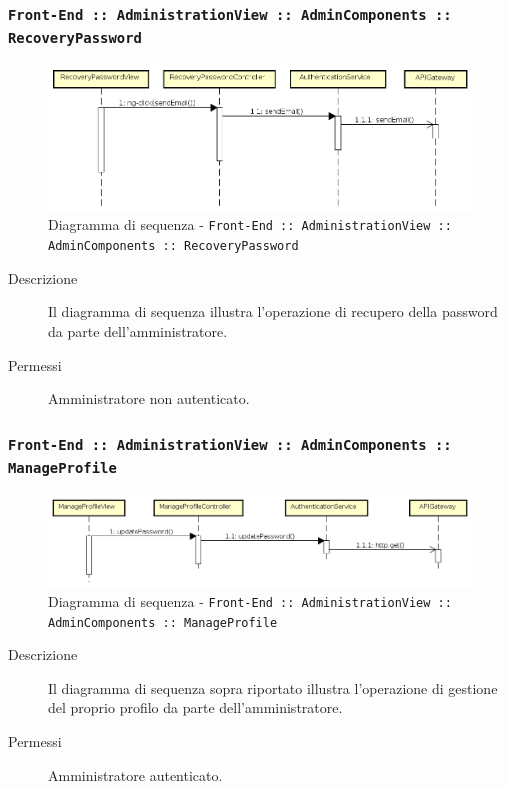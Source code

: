 \documentclass[../DefinizioneDiProdotto_v2.0.0.tex]{subfiles}
\begin{document}
\newpage
\subsubsection{\texttt{Front-End :: AdministrationView :: AdminComponents :: RecoveryPassword}}
\begin{figure}[!h]
	\centering
	\includegraphics[scale=0.3]{DiagrammiSequenza/Front-End/AdministrationView/RecoveryPassword.png}
	\caption{Diagramma di sequenza - \texttt{Front-End :: AdministrationView :: AdminComponents :: RecoveryPassword}}
\end{figure}
\begin{description}
	\item [Descrizione] Il diagramma di sequenza illustra l'operazione di recupero della password da parte dell'amministratore.
	\item [Permessi] Amministratore non autenticato.
\end{description}

\subsubsection{\texttt{Front-End :: AdministrationView :: AdminComponents :: ManageProfile}}
\begin{figure}[!h]
	\centering
	\includegraphics[scale=0.3]{DiagrammiSequenza/Front-End/AdministrationView/ManageProfile.png}
	\caption{Diagramma di sequenza - \texttt{Front-End :: AdministrationView :: AdminComponents :: ManageProfile }}
\end{figure}
\begin{description}
	\item [Descrizione] Il diagramma di sequenza sopra riportato illustra l'operazione di gestione del proprio profilo da parte dell'amministratore.
	\item [Permessi] Amministratore autenticato.
\end{description}
\end{document}
